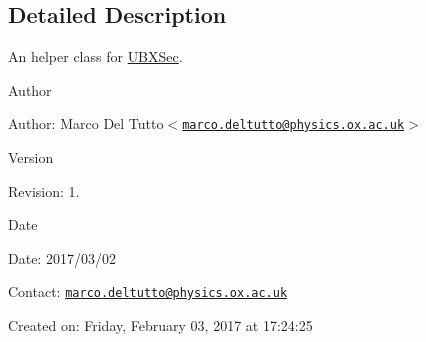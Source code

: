 \subsection{\-Detailed \-Description}
\-An helper class for \hyperlink{classUBXSec}{\-U\-B\-X\-Sec}. 

\begin{DoxyAuthor}{\-Author}

\end{DoxyAuthor}
\begin{DoxyParagraph}{\-Author\-:}
\-Marco \-Del \-Tutto$<$\href{mailto:marco.deltutto@physics.ox.ac.uk}{\tt marco.\-deltutto@physics.\-ox.\-ac.\-uk}$>$ 
\end{DoxyParagraph}


\begin{DoxyVersion}{\-Version}

\end{DoxyVersion}
\begin{DoxyParagraph}{\-Revision\-:}
1. 
\end{DoxyParagraph}


\begin{DoxyDate}{\-Date}

\end{DoxyDate}
\begin{DoxyParagraph}{\-Date\-:}
2017/03/02 
\end{DoxyParagraph}


\-Contact\-: \href{mailto:marco.deltutto@physics.ox.ac.uk}{\tt marco.\-deltutto@physics.\-ox.\-ac.\-uk}

\-Created on\-: \-Friday, \-February 03, 2017 at 17\-:24\-:25 

